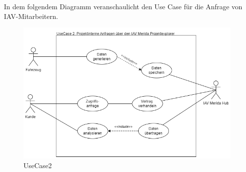 \newline
In dem folgendem Diagramm veranschaulicht den Use Case für die Anfrage von IAV-Mitarbeitern.
\begin{figure}[H]
    \centering
    \includegraphics[scale=.6]{media/UseCase2}
    \caption{UseCase2}
    \label{fig:UseCase2}
  \end{figure}
  \newpage
